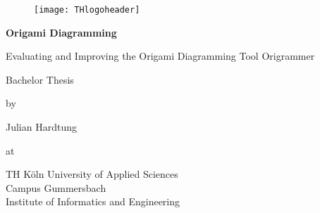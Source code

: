 
\begin{titlepage}
	\begin{center}
	
		\begin{figure}[!htbp]
			\texttt{[image: THlogoheader]}
		\end{figure}
		
		\vspace{0.8cm}
		
		\begin{rmfamily}
			\begin{huge}
				\textbf{Origami Diagramming}\\
			\end{huge}
			\vspace{0.5cm}
			\begin{LARGE}
				Evaluating and Improving the Origami Diagramming Tool Origrammer\\
			\end{LARGE}
		\end{rmfamily}
		
		\vspace{1.5cm}
		
		\begin{LARGE}
			\begin{scshape}
				Bachelor Thesis\\[0.8em]
			\end{scshape}
		\end{LARGE}
		
		\begin{large}
			by\\
			\begin{LARGE}
				Julian Hardtung\\
			\end{LARGE}
		\end{large}
		
		\vfill
		
		\begin{large}
			at\\
			\vspace{0.2cm}
			\begin{scshape}
				TH Köln University of Applied Sciences\\
				Campus Gummersbach\\
				Institute of Informatics and Engineering
			\end{scshape}
		\end{large}
		

\end{center}
\end{titlepage}
